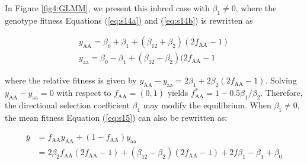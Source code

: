 \documentclass[12pt,]{article}
\begin{document}
In Figure \ref{fig4:GLMM}, we present this inbred case with $\beta_1 \neq 0$, where the genotype fitness Equations (\ref{eq:s14a}) and (\ref{eq:s14b}) is rewritten as

\begin{subequations}
\begin{align}
    y_\mathrm{AA} = \beta_0 + \beta_1 + (\beta_{12}+\beta_2)(2f_\mathrm{AA}-1) \label{eq:s16a} \\
    y_\mathrm{aa} = \beta_0 - \beta_1 + (\beta_{12}-\beta_2)(2f_\mathrm{AA}-1 \label{eq:s16b}
\end{align}
\end{subequations}

\noindent
where the relative fitness is given by $y_\mathrm{AA} - y_\mathrm{aa} = 2\beta_1 + 2\beta_2(2f_\mathrm{AA}-1)$. Solving $y_\mathrm{AA} - y_\mathrm{aa} = 0$ with respect to $f_\mathrm{AA} = (0,1)$ yields $f^*_\mathrm{AA} = 1 - 0.5\beta_1 / \beta_2$. Therefore, the directional selection coefficient $\beta_1$ may modify the equilibrium. When $\beta_1 \neq 0$, the mean fitness Equation (\ref{eq:s15}) can also be rewritten as:

\begin{equation}
\begin{split}
\bar{y} &= f_\mathrm{AA}y_\mathrm{AA} + (1-f_\mathrm{AA})y_\mathrm{aa} \\
&= 2\beta_{2}f_\mathrm{AA}(2f_\mathrm{AA}-1) + (\beta_{12}-\beta_2)(2f_\mathrm{AA}-1) + 2f\beta_1 - \beta_1 + \beta_0 \label{eq:s16}
\end{split}
\end{equation}
\end{document}
